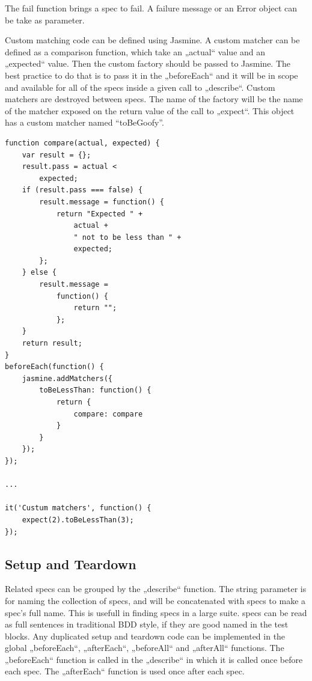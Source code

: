 \documentclass[11pt]{article}
\begin{document}
The fail function brings a spec to fail. A failure message or an Error object can be take as parameter.

Custom matching code can be defined using Jasmine. A custom matcher can be defined as a comparison function, which take an „actual“ value and an „expected“ value. Then the custom factory should be passed to Jasmine. The best practice to do that is to pass it in the „beforeEach“ and it will be in scope and available for all of the specs inside a given call to „describe“. Custom matchers are destroyed between specs. The name of the factory will be the name of the matcher exposed on the return value of the call to „expect“. This object has a custom matcher named “toBeGoofy”. 

\begin{lstlisting}[caption=Custom matchers]
function compare(actual, expected) {
    var result = {};
    result.pass = actual <
        expected;
    if (result.pass === false) {
        result.message = function() {
            return "Expected " +
                actual +
                " not to be less than " +
                expected;
        };
    } else {
        result.message =
            function() {
                return "";
            };
    }
    return result;
}
beforeEach(function() {
    jasmine.addMatchers({
        toBeLessThan: function() {
            return {
                compare: compare
            }
        }
    });
});

...

it('Custum matchers', function() {
    expect(2).toBeLessThan(3);
});
\end{lstlisting}

\subsection{Setup and Teardown}

Related specs can be grouped by the „describe“ function. The string parameter is for naming the collection of specs, and will be concatenated with specs to make a spec’s full name. This is usefull in finding specs in a large suite. specs can be read as full sentences in traditional BDD style, if they are good named in the test blocks. Any duplicated setup and teardown code can be implemented in the global „beforeEach“, „afterEach“, „beforeAll“ and „afterAll“ functions. The „beforeEach“ function is called in the „describe“ in which it is called once before each spec. The „afterEach“ function is used once after each spec.
\end{document}
